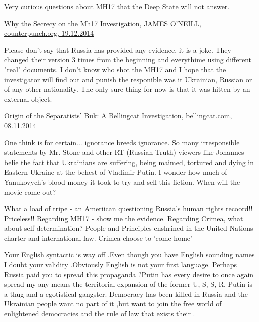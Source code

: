 \begin{itemize}
\begin{itemize}
Very curious questions about MH17 that the Deep State will not answer.

\href{https://www.counterpunch.org/2014/12/19/why-the-secrecy-on-the-mh17-investigation/}{%
Why the Secrecy on the Mh17 Investigation, JAMES O'NEILL, counterpunch.org, 19.12.2014%
}


Please don't say that Russia has provided any evidence, it is a joke. They
changed their version 3 times from the beginning and everythime using different
"real" documents. I don't know who shot the MH17 and I hope that the
investigator will find out and punish the responible was it Ukrainian, Russian
or of any other nationality. The only sure thing for now is that it was hitten
by an external object.


\href{https://www.bellingcat.com/news/uk-and-europe/2014/11/08/origin-of-the-separatists-buk-a-bellingcat-investigation/}{%
Origin of the Separatists' Buk: A Bellingcat Investigation, bellingcat.com, 08.11.2014%
}


One think is for certain... ignorance breeds ignorance. So many irresponsible
statements by Mr. Stone and other RT (Russian Truth) viewers like Johannes
belie the fact that Ukrainians are suffering, being maimed, tortured and dying
in Eastern Ukraine at the behest of Vladimir Putin. I wonder how much of
Yanukovych's blood money it took to try and sell this fiction. When will the
movie come out?



What a load of tripe - an Ameriican questioning Russia's human rights recoord!!
Priceless!! Regarding MH17 - show me the evidence. Regarding Crimea, what about
self determination? People and Principles enshrined in the United Nations
charter and international law. Crimea choose to 'come home'


Your English syntactic is way off .Even though you have English sounding names
I doubt your validity .Obviously English is not your first language. Perhaps
Russia paid you to spread this propaganda ?Putin has every desire to once again
spread my any means the territorial expansion of the former U, S, S, R. Putin is a
thug and a egotistical gangster. Democracy has been killed in Russia and the
Ukrainian people want no part of it ,but want to join the free world of
enlightened democracies and the rule of law that exists their .


\end{itemize}
\end{itemize}
